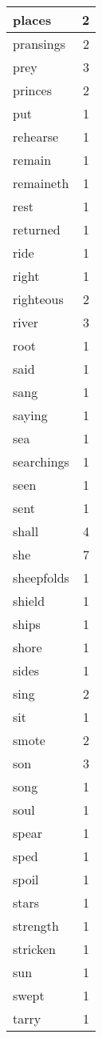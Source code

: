 \begin{center}
\begin{longtable}{l|r}
places & 2\\ \hline 
pransings & 2\\ \hline 
prey & 3\\ \hline 
princes & 2\\ \hline 
put & 1\\ \hline 
rehearse & 1\\ \hline 
remain & 1\\ \hline 
remaineth & 1\\ \hline 
rest & 1\\ \hline 
returned & 1\\ \hline 
ride & 1\\ \hline 
right & 1\\ \hline 
righteous & 2\\ \hline 
river & 3\\ \hline 
root & 1\\ \hline 
said & 1\\ \hline 
sang & 1\\ \hline 
saying & 1\\ \hline 
sea & 1\\ \hline 
searchings & 1\\ \hline 
seen & 1\\ \hline 
sent & 1\\ \hline 
shall & 4\\ \hline 
she & 7\\ \hline 
sheepfolds & 1\\ \hline 
shield & 1\\ \hline 
ships & 1\\ \hline 
shore & 1\\ \hline 
sides & 1\\ \hline 
sing & 2\\ \hline 
sit & 1\\ \hline 
smote & 2\\ \hline 
son & 3\\ \hline 
song & 1\\ \hline 
soul & 1\\ \hline 
spear & 1\\ \hline 
sped & 1\\ \hline 
spoil & 1\\ \hline 
stars & 1\\ \hline 
strength & 1\\ \hline 
stricken & 1\\ \hline 
sun & 1\\ \hline 
swept & 1\\ \hline 
tarry & 1\\ \hline 

\end{longtable}
\end{center}
